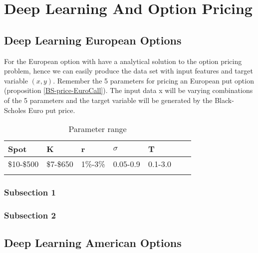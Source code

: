 
\chapter{Deep Learning And Option Pricing} %

\label{Chapter5} %


\section{Deep Learning European Options}
For the European option with have a analytical solution to the option pricing problem, hence we can easily produce the data set with input features and target variable $(x,y)$. Remember the 5 parameters for pricing an European put option (proposition \ref{BS-price-EuroCall}). The input data x will be varying combinations of the 5 parameters and the target variable will be generated by the Black-Scholes Euro put price. 

\begin{table}[th]
\caption{Parameter range}
\label{tab:treatments}
\centering
\begin{tabular}{l l l l l l l }
\toprule
\textbf{Spot} &  \textbf{K} & \textbf{r} & \textbf{$\sigma$} & \textbf{T} \\
\midrule
\$10-\$500 & \$7-\$650 & 1\%-3\% & 0.05-0.9 & 0.1-3.0\\ 
\bottomrule\\
\end{tabular}
\end{table}

\subsection{Subsection 1}



\subsection{Subsection 2}



\section{Deep Learning American Options}

